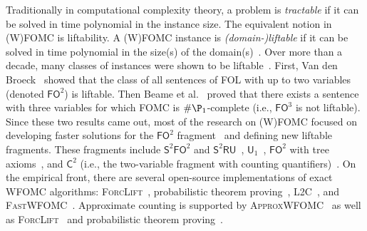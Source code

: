 \documentclass{article}
\theoremstyle{definition}
\newcommand{\FOtwo}{$\mathsf{FO}^{2}$}
\newcommand{\FOthree}{$\mathsf{FO}^{3}$}
\newcommand{\SFO}{$\mathsf{S}^{2}\mathsf{FO}^{2}$}
\newcommand{\SRU}{$\mathsf{S}^{2}\mathsf{RU}$}
\newcommand{\Uone}{$\mathsf{U}_{1}$}
\newcommand{\Ctwo}{$\mathsf{C}^{2}$}
\begin{document}
Traditionally in computational complexity theory, a problem is \emph{tractable}
if it can be solved in time polynomial in the instance size. The equivalent
notion in (W)FOMC is liftability. A (W)FOMC instance is \emph{(domain-)liftable}
if it can be solved in time polynomial in the size(s) of the
domain(s)~\cite{jaeger2012liftability}. Over more than a decade, many classes of
instances were shown to be
liftable~\cite{DBLP:conf/kr/BremenK21,DBLP:conf/nips/KazemiKBP16,DBLP:conf/lics/KuusistoL18,DBLP:journals/jair/Kuzelka21}.
First, Van den Broeck~ showed that the class
of all sentences of FOL with up to two variables (denoted \FOtwo{}) is liftable.
Then Beame et al.~ proved that there exists
a sentence with three variables for which FOMC is $\#\P_{1}$-complete (i.e.,
\FOthree{} is not liftable). Since these two results came out, most of the
research on (W)FOMC focused on developing faster solutions for the \FOtwo{}
fragment~\cite{DBLP:conf/uai/BremenK21,DBLP:conf/aaai/MalhotraS22} and defining
new liftable fragments. These fragments include \SFO{} and
\SRU{}~\cite{DBLP:conf/nips/KazemiKBP16},
\Uone{}~\cite{DBLP:conf/lics/KuusistoL18}, \FOtwo{} with tree
axioms~\cite{DBLP:conf/kr/BremenK21}, and \Ctwo{} (i.e., the two-variable
fragment with counting
quantifiers)~\cite{DBLP:journals/jair/Kuzelka21,DBLP:conf/aaai/MalhotraS22}. On
the empirical front, there are several open-source implementations of exact
WFOMC algorithms: \textsc{ForcLift}~\cite{DBLP:conf/ijcai/BroeckTMDR11},
probabilistic theorem proving~\cite{DBLP:journals/cacm/GogateD16},
\textsc{L2C}~\cite{DBLP:conf/kr/KazemiP16}, and
\textsc{FastWFOMC}~\cite{DBLP:conf/uai/BremenK21}. Approximate counting is
supported by \textsc{ApproxWFOMC}~\cite{DBLP:conf/ijcai/BremenK20} as well as
\textsc{ForcLift}~\cite{DBLP:conf/uai/BroeckCD12} and probabilistic theorem
proving~\cite{DBLP:journals/cacm/GogateD16}.

\end{document}
